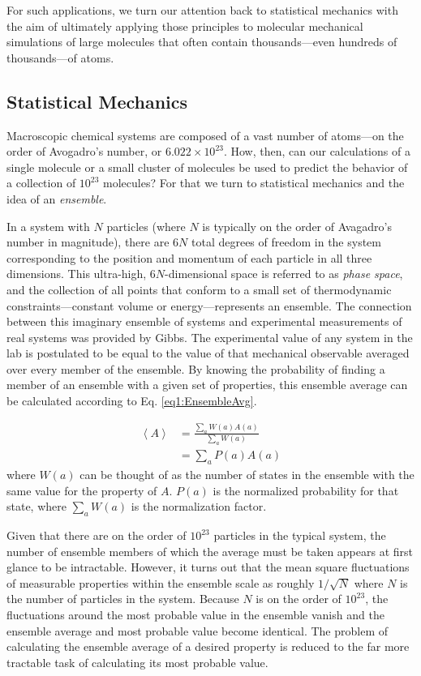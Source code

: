For such applications, we turn our attention back to statistical mechanics with
the aim of ultimately applying those principles to molecular mechanical
simulations of large molecules that often contain thousands---even hundreds of
thousands---of atoms.

\subsection{Statistical Mechanics}

Macroscopic chemical systems are composed of a vast number of atoms---on the
order of Avogadro's number, or $6.022 \times 10 ^ {23}$. How, then, can our
calculations of a single molecule or a small cluster of molecules be used to
predict the behavior of a collection of $10 ^ {23}$ molecules? For that we turn
to statistical mechanics and the idea of an \emph{ensemble}.

In a system with $N$ particles (where $N$ is typically on the order of
Avagadro's number in magnitude), there are $6 N$ total degrees of freedom in the
system corresponding to the position and momentum of each particle in all three
dimensions. This ultra-high, $6N$-dimensional space is referred to as
\emph{phase space}, and the collection of all points that conform to a small set
of thermodynamic constraints---\eg constant volume or energy---represents an
ensemble. \cite{McQuarrie_Book_StatMech_1973} The connection between this
imaginary ensemble of systems and experimental measurements of real systems was
provided by Gibbs. The experimental value of any system in the lab is postulated
to be equal to the value of that mechanical observable averaged over every
member of the ensemble. \cite{McQuarrie_Book_StatMech_1973} By knowing the
probability of finding a member of an ensemble with a given set of properties,
this ensemble average can be calculated according to Eq. \ref{eq1:EnsembleAvg}.

\begin{align}
   \left < A \right > & = \frac {\sum_a W(a) A(a)} {\sum_a W(a)} \nonumber \\
                      & = \sum_a P(a) A(a)
   \label{eq1:EnsembleAvg}
\end{align}
where $W(a)$ can be thought of as the number of states in the ensemble with the
same value for the property of $A$. $P(a)$ is the normalized probability for
that state, where $\sum_a W(a)$ is the normalization factor.

Given that there are on the order of $10^{23}$ particles in the typical system,
the number of ensemble members of which the average must be taken appears at
first glance to be intractable. However, it turns out that the mean square
fluctuations of measurable properties within the ensemble scale as roughly $1 /
\sqrt{N}$ where $N$ is the number of particles in the system.  Because $N$ is on
the order of $10 ^ {23}$, the fluctuations around the most probable value in the
ensemble vanish and the ensemble average and most probable value become
identical. The problem of calculating the ensemble average of a desired property
is reduced to the far more tractable task of calculating its most probable
value.

